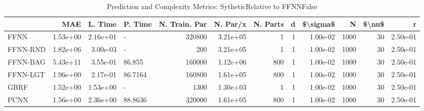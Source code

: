 \begin{table}
\centering
\caption{Prediction and Complexity Metrics: SytheticRelative to FFNNFalse}
\label{tab__Sythetic__Fix_Neurons_QTrue}
\begin{tabular}{lrrlrrrrrrrr}
\toprule
{} &      MAE &  L. Time &  P. Time &  N. Train. Par &  N. Par/x &  N. Parts &  d &  \$\textbackslash sigma\$ &     N &  \$\textbackslash nu\$ &        r \\
\midrule
FFNN     & 1.53e+00 & 2.16e+01 &        - &         320800 &  3.21e+05 &         1 &  1 &  1.00e-02 &  1000 &     30 & 2.50e-01 \\
FFNN-RND & 1.82e+06 & 3.00e-03 &        - &            200 &  3.21e+05 &         1 &  1 &  1.00e-02 &  1000 &     30 & 2.50e-01 \\
FFNN-BAG & 5.43e+11 & 3.55e-01 &   86.855 &         160000 &  1.12e+06 &       800 &  1 &  1.00e-02 &  1000 &     30 & 2.50e-01 \\
FFNN-LGT & 1.96e+00 & 2.17e-01 &  86.7164 &         160800 &  1.61e+05 &       800 &  1 &  1.00e-02 &  1000 &     30 & 2.50e-01 \\
GBRF     & 1.52e+00 & 1.53e+00 &        - &           1300 &  1.30e+03 &         1 &  1 &  1.00e-02 &  1000 &     30 & 2.50e-01 \\
PCNN     & 1.56e+00 & 2.36e+00 &  88.8636 &         320000 &  1.61e+05 &       800 &  1 &  1.00e-02 &  1000 &     30 & 2.50e-01 \\
\bottomrule
\end{tabular}
\end{table}

